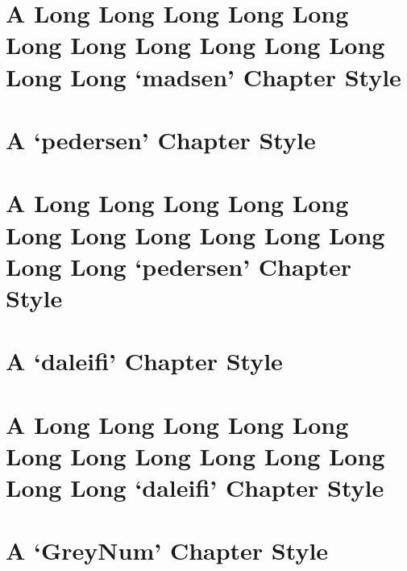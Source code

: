 \documentclass[10pt,a4paper,extrafontsizes,oldfontcommands,oneside]{memoir}
\begin{document}


\chapter{A Long Long Long Long Long Long Long Long Long Long Long Long Long `madsen' Chapter Style} %
\label{chap:a_long_madsen_chapter_style}



\chapter{A `pedersen' Chapter Style} %
\label{chap:a_pedersen_chapter_style}



\chapter{A Long Long Long Long Long Long Long Long Long Long Long Long Long `pedersen' Chapter Style} %
\label{chap:a_long_pedersen_chapter_style}



\chapter{A `daleifi' Chapter Style} %
\label{chap:a_daleifi_chapter_style}



\chapter{A Long Long Long Long Long Long Long Long Long Long Long Long Long `daleifi' Chapter Style} %
\label{chap:a_long_daleifi_chapter_style}



\chapter{A `GreyNum' Chapter Style} %
\label{chap:a_GreyNum_chapter_style}

\end{document}
